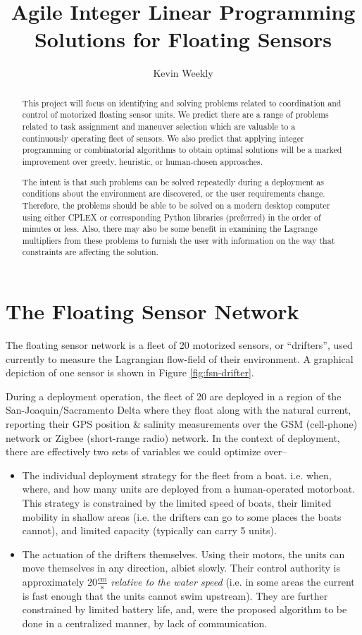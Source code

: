 \documentclass[letter,10pt]{article}
\title{Agile Integer Linear Programming Solutions for Floating Sensors}
\author{Kevin Weekly}
\begin{document}
\maketitle

\begin{abstract}
This project will focus on identifying and solving problems related to coordination and control of motorized floating sensor units. We predict there are a range of problems related to task assignment and maneuver selection which are valuable to a continuously operating fleet of sensors.  We also predict that applying integer programming or combinatorial algorithms to obtain optimal solutions will be a marked improvement over greedy, heuristic, or human-chosen approaches.

The intent is that such problems can be solved repeatedly during a deployment as conditions about the environment are discovered, or the user requirements change.  Therefore, the problems should be able to be solved on a modern desktop computer using either CPLEX or corresponding Python libraries (preferred) in the order of minutes or less.  Also, there may also be some benefit in examining the Lagrange multipliers from these problems to furnish the user with information on the way that constraints are affecting the solution. 
\end{abstract}

\section{The Floating Sensor Network}

The floating sensor network is a fleet of 20 motorized sensors, or ``drifters'', used currently to measure the Lagrangian flow-field of their environment.  A graphical depiction of one sensor is shown in Figure \ref{fig:fsn-drifter}. 

During a deployment operation, the fleet of 20 are deployed in a region of the San-Joaquin/Sacramento Delta where they float along with the natural current, reporting their GPS position \& salinity measurements over the GSM (cell-phone) network or Zigbee (short-range radio) network.  In the context of deployment, there are effectively two sets of variables we could optimize over--
\begin{itemize}
 \item The individual deployment strategy for the fleet from a boat. i.e. when, where, and how many units are deployed from a human-operated motorboat.  This strategy is constrained by the limited speed of boats, their limited mobility in shallow areas (i.e. the drifters can go to some places the boats cannot), and limited capacity (typically can carry 5 units).
 \item The actuation of the drifters themselves.  Using their motors, the units can move themselves in any direction, albiet slowly.  Their control authority is approximately $20 \frac{\mbox{cm}}{\mbox{s}}$ \emph{relative to the water speed} (i.e. in some areas the current is fast enough that the units cannot swim upstream).  They are further constrained by limited battery life, and, were the proposed algorithm to be done in a centralized manner, by lack of communication.
\end{itemize}
\end{document}
